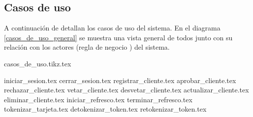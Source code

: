 %
%
%

\subsection{Casos de uso}

A continuación de detallan los casos de uso del sistema. En el diagrama
\ref{casos_de_uso_general} se muestra una vista general de todos junto con su
relación con los actores (regla de negocio )
del sistema.

\begin{sidewaysfigure}
  \begin{center}
    {casos_de_uso.tikz.tex}
    \caption{Diagrama general de casos de uso.}
    \label{casos_de_uso_general}
  \end{center}
\end{sidewaysfigure}

{iniciar_sesion.tex}
{cerrar_sesion.tex}
{registrar_cliente.tex}
{aprobar_cliente.tex}
{rechazar_cliente.tex}
{vetar_cliente.tex}
{desvetar_cliente.tex}
{actualizar_cliente.tex}
{eliminar_cliente.tex}
{iniciar_refresco.tex}
{terminar_refresco.tex}
{tokenizar_tarjeta.tex}
{detokenizar_token.tex}
{retokenizar_token.tex}
